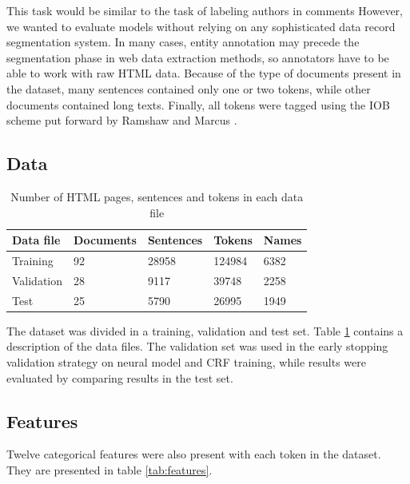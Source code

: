 \documentclass[sigconf]{acmart}
\begin{document}
This task would be similar to the task of labeling authors in comments
However, we wanted to evaluate models without relying on any sophisticated data record
segmentation system. In many cases, entity annotation may precede the segmentation
phase in web data extraction methods, so annotators have to be able to work with
raw HTML data. Because of the type of documents present in the dataset, many sentences 
contained only one or two tokens, while other documents contained long texts.
Finally, all tokens were tagged using the IOB scheme put forward by
Ramshaw and Marcus \cite{Ramshaw1995}. 

\subsection{Data}

\begin{table}[h]
  \small
  \begin{center}
    \begin{tabular}{ |l|l|l|l|l| }
      \hline
      Data file & Documents & Sentences & Tokens & Names \\
      \hline
      Training    & 92 & 28958 & 124984 & 6382 \\
      Validation  & 28 & 9117  & 39748  & 2258 \\
      Test        & 25 & 5790  & 26995  & 1949 \\
      \hline
    \end{tabular}
  \end{center}
  \caption{Number of HTML pages, sentences and tokens in each data file}
  \label{tab:dataset}
\end{table}

The dataset was divided in a training, validation and test set. Table \ref{tab:dataset} contains
a description of the data files. The validation set was used in the early stopping validation strategy
on neural model and CRF training, while results were evaluated by comparing results in the test set.

\subsection{Features}

Twelve categorical features were also present with each token in the dataset. They 
are presented in table \ref{tab:features}.
\end{document}
